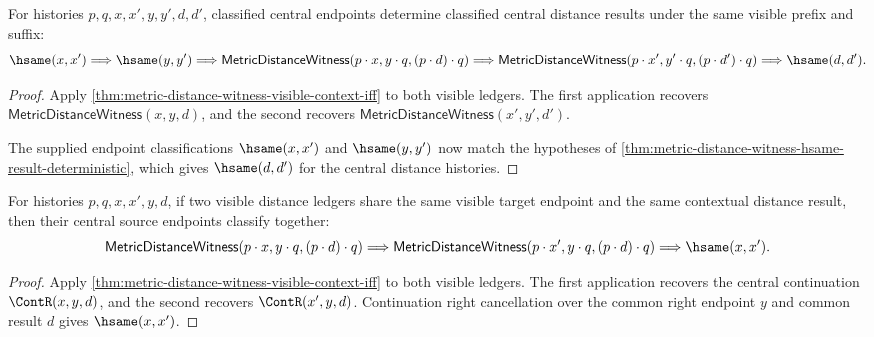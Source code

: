 \begin{theorem}
\label{thm:metric-distance-witness-visible-context-endpoint-hsame-result-deterministic}
For histories $p,q,x,x',y,y',d,d'$, classified central endpoints determine
classified central distance results under the same visible prefix and suffix:
$$
\hsame(x,x')\Longrightarrow
\hsame(y,y')\Longrightarrow
\mathsf{MetricDistanceWitness}(p\cdot x,y\cdot q,(p\cdot d)\cdot q)
\Longrightarrow
\mathsf{MetricDistanceWitness}(p\cdot x',y'\cdot q,(p\cdot d')\cdot q)
\Longrightarrow
\hsame(d,d').
$$
\end{theorem}
\begin{proof}
Apply \autoref{thm:metric-distance-witness-visible-context-iff} to both visible
ledgers. The first application recovers
$\mathsf{MetricDistanceWitness}(x,y,d)$, and the second recovers
$\mathsf{MetricDistanceWitness}(x',y',d')$.

The supplied endpoint classifications $\hsame(x,x')$ and $\hsame(y,y')$ now
match the hypotheses of
\autoref{thm:metric-distance-witness-hsame-result-deterministic}, which gives
$\hsame(d,d')$ for the central distance histories.
\end{proof}

\begin{theorem}
\label{thm:metric-distance-witness-visible-context-source-deterministic}
For histories $p,q,x,x',y,d$, if two visible distance ledgers share the same
visible target endpoint and the same contextual distance result, then their
central source endpoints classify together:
$$
\mathsf{MetricDistanceWitness}(p\cdot x,y\cdot q,(p\cdot d)\cdot q)
\Longrightarrow
\mathsf{MetricDistanceWitness}(p\cdot x',y\cdot q,(p\cdot d)\cdot q)
\Longrightarrow
\hsame(x,x').
$$
\end{theorem}
\begin{proof}
Apply \autoref{thm:metric-distance-witness-visible-context-iff} to both visible
ledgers. The first application recovers the central continuation
$\ContR(x,y,d)$, and the second recovers $\ContR(x',y,d)$.
Continuation right cancellation over the common right endpoint $y$ and common
result $d$ gives $\hsame(x,x')$.
\end{proof}

